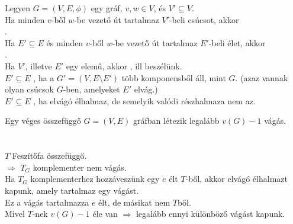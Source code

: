 \begin{frame}
\begin{tcolorbox}[title={Elvágó élhalmaz, vágás}]
Legyen $G =  (V, E, {\phi})$ egy gráf, $v, w \in V$, és $V' \subseteq V$.\\
\mbigskip
Ha minden $v$-ből $w$-be vezető út tartalmaz $V'$-beli csúcsot, akkor\\
\mmedskip
{}.\\
\mmedskip
Ha $E' \subseteq E$ és minden $v$-ből $w$-be vezető út tartalmaz $E'$-beli élet, akkor\\
\mmedskip
{}.\\
\mbigskip
Ha $V'$, illetve $E'$ egy elemű, akkor , ill  beszélünk.\\
\mbigskip
$E' \subseteq E$ , ha a $G' = (V, E \setminus E')$ több komponensből áll, mint $G$. (azaz vannak olyan csúcsok $G$-ben, amelyeket $E'$ elvág.)\\
\mbigskip
$E' \subseteq E$ , ha elvágó élhalmaz, de semelyik  valódi részhalmaza nem az.
\end{tcolorbox}
\end{frame}

\begin{frame}
\begin{tcolorbox}[title={Tétel: Vágások száma}]
Egy véges összefüggő $G = (V, E)$ gráfban létezik legalább $v(G) - 1$ vágás.\\
\tcblower
\msmallskip
\underline{}\\
\mmedskip
\\
$T$ Feszítőfa összefüggő.\\
$\Rightarrow$ $T_G$ komplementer nem vágás.\\
Ha $T_G$ komplementerhez hozzáveszünk egy $e$ élt $T$-ből, akkor elvágó élhalmazt kapunk, amely tartalmaz egy vágást.\\
Ez a vágás tartalmazza $e$ élt, de másikat nem $T$ből.\\
Mivel $T$-nek $v(G) - 1$ éle van $\Rightarrow$ legalább ennyi különböző vágást kapunk.
\end{tcolorbox}
\end{frame}

